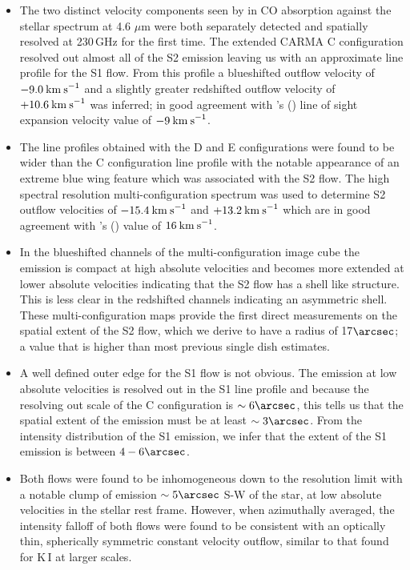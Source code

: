 \begin{itemize}

\item The two distinct velocity components seen by \cite{bernat_1979} in CO absorption against the stellar spectrum at 4.6 $\mu$m were both separately detected and spatially resolved at 230\,GHz for the first time. The extended CARMA C configuration resolved out almost all of the S2 emission leaving us with an approximate line profile for the S1 flow. From this profile a blueshifted outflow velocity of $-9.0\>{\rm km\>s}^{-1}$ and a slightly greater redshifted outflow velocity of $+10.6\>{\rm km\>s}^{-1}$ was inferred; in good agreement with \citeauthor{bernat_1979}'s (\citeyear{bernat_1979}) line of sight expansion velocity value of $-9\>{\rm km\>s}^{-1}$.  

\item The line profiles obtained with the D and E configurations were found to be wider than the C configuration line profile with the notable appearance of an extreme blue wing feature which was associated with the S2 flow. The high spectral resolution multi-configuration spectrum was used to determine S2 outflow velocities of $-15.4\>{\rm km\>s}^{-1}$ and $+13.2\>{\rm km\>s}^{-1}$ which are in good agreement with \citeauthor{bernat_1979}'s (\citeyear{bernat_1979})  value of $16\>{\rm km\>s}^{-1}$.  

\item In the blueshifted channels of the  multi-configuration image cube the emission is compact at high absolute velocities and becomes more extended at lower absolute velocities indicating that the S2 flow has a shell like structure. This is less clear in the redshifted channels indicating an asymmetric shell. These multi-configuration maps provide the first direct measurements on the spatial extent of the S2 flow, which we derive to have a radius of 17$\arcsec$; a value that is higher than most previous single dish estimates. 

\item A well defined outer edge for the S1 flow is not obvious. The emission at low absolute velocities is resolved out in the S1 line profile and because the resolving out scale of the C configuration is $\sim 6\arcsec$, this tells us that the spatial extent of the emission must be at least $\sim 3\arcsec$. From the intensity distribution of the S1 emission, we infer that the extent of the S1 emission is between $4-6\arcsec$.

\item Both flows were found to be inhomogeneous down to the resolution limit with a notable clump of emission $\sim 5\arcsec$ S-W of the star, at low absolute velocities in the stellar rest frame. However, when azimuthally averaged, the intensity falloff of both flows were found to be consistent with an optically thin, spherically symmetric constant velocity outflow, similar to that found for K\,I at larger scales.


\end{itemize}
